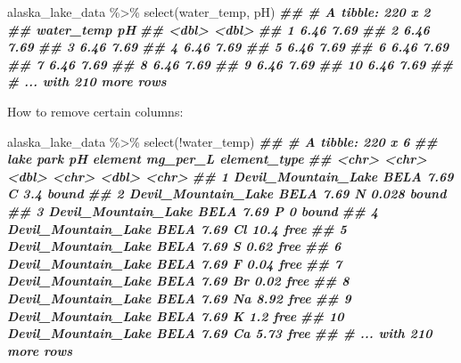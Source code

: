 \documentclass[
]{krantz}
\newenvironment{Shaded}{\begin{snugshade}}{\end{snugshade}}
\newcommand{\DocumentationTok}[1]{\textcolor[rgb]{0.56,0.35,0.01}{\textbf{\textit{#1}}}}
\newcommand{\FunctionTok}[1]{\textcolor[rgb]{0.00,0.00,0.00}{#1}}
\newcommand{\NormalTok}[1]{#1}
\newcommand{\SpecialCharTok}[1]{\textcolor[rgb]{0.00,0.00,0.00}{#1}}
\begin{document}
\begin{Shaded}
\begin{Highlighting}[]
\NormalTok{alaska\_lake\_data }\SpecialCharTok{\%\textgreater{}\%}
  \FunctionTok{select}\NormalTok{(water\_temp, pH)}
\DocumentationTok{\#\# \# A tibble: 220 x 2}
\DocumentationTok{\#\#    water\_temp    pH}
\DocumentationTok{\#\#         \textless{}dbl\textgreater{} \textless{}dbl\textgreater{}}
\DocumentationTok{\#\#  1       6.46  7.69}
\DocumentationTok{\#\#  2       6.46  7.69}
\DocumentationTok{\#\#  3       6.46  7.69}
\DocumentationTok{\#\#  4       6.46  7.69}
\DocumentationTok{\#\#  5       6.46  7.69}
\DocumentationTok{\#\#  6       6.46  7.69}
\DocumentationTok{\#\#  7       6.46  7.69}
\DocumentationTok{\#\#  8       6.46  7.69}
\DocumentationTok{\#\#  9       6.46  7.69}
\DocumentationTok{\#\# 10       6.46  7.69}
\DocumentationTok{\#\# \# ... with 210 more rows}
\end{Highlighting}
\end{Shaded}

How to remove certain columns:

\begin{Shaded}
\begin{Highlighting}[]
\NormalTok{alaska\_lake\_data }\SpecialCharTok{\%\textgreater{}\%}
  \FunctionTok{select}\NormalTok{(}\SpecialCharTok{!}\NormalTok{water\_temp)}
\DocumentationTok{\#\# \# A tibble: 220 x 6}
\DocumentationTok{\#\#    lake                park     pH element mg\_per\_L element\_type}
\DocumentationTok{\#\#    \textless{}chr\textgreater{}               \textless{}chr\textgreater{} \textless{}dbl\textgreater{} \textless{}chr\textgreater{}      \textless{}dbl\textgreater{} \textless{}chr\textgreater{}       }
\DocumentationTok{\#\#  1 Devil\_Mountain\_Lake BELA   7.69 C          3.4   bound       }
\DocumentationTok{\#\#  2 Devil\_Mountain\_Lake BELA   7.69 N          0.028 bound       }
\DocumentationTok{\#\#  3 Devil\_Mountain\_Lake BELA   7.69 P          0     bound       }
\DocumentationTok{\#\#  4 Devil\_Mountain\_Lake BELA   7.69 Cl        10.4   free        }
\DocumentationTok{\#\#  5 Devil\_Mountain\_Lake BELA   7.69 S          0.62  free        }
\DocumentationTok{\#\#  6 Devil\_Mountain\_Lake BELA   7.69 F          0.04  free        }
\DocumentationTok{\#\#  7 Devil\_Mountain\_Lake BELA   7.69 Br         0.02  free        }
\DocumentationTok{\#\#  8 Devil\_Mountain\_Lake BELA   7.69 Na         8.92  free        }
\DocumentationTok{\#\#  9 Devil\_Mountain\_Lake BELA   7.69 K          1.2   free        }
\DocumentationTok{\#\# 10 Devil\_Mountain\_Lake BELA   7.69 Ca         5.73  free        }
\DocumentationTok{\#\# \# ... with 210 more rows}
\end{Highlighting}
\end{Shaded}
\end{document}
